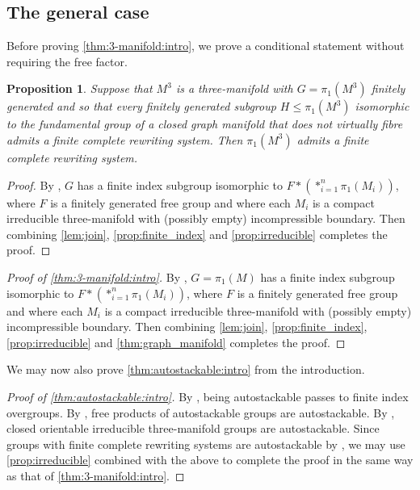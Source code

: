 \documentclass[12pt, a4paper]{amsart}
\newtheorem{proposition}[theorem]{Proposition}
\theoremstyle{definition}
\begin{document}
\subsection{The general case}

Before proving \cref{thm:3-manifold:intro}, we prove a conditional statement without requiring the free factor.

\begin{proposition}
\label{prop:conditional}
Suppose that $M^3$ is a three-manifold with $G = \pi_1(M^3)$ finitely generated and so that every finitely generated subgroup $H\leqslant \pi_1(M^3)$ isomorphic to the fundamental group of a closed graph manifold that does not virtually fibre admits a finite complete rewriting system. Then $\pi_1(M^3)$ admits a finite complete rewriting system.
\end{proposition}

\begin{proof}
By \cite[Proposition 2.2]{KL24b}, $G$ has a finite index subgroup isomorphic to $F*(*_{i=1}^n\pi_1(M_i))$, where $F$ is a finitely generated free group and where each $M_i$ is a compact irreducible three-manifold with (possibly empty) incompressible boundary. Then combining \cref{lem:join}, \cref{prop:finite_index} and \cref{prop:irreducible} completes the proof.
\end{proof}



\begin{proof}[Proof of \cref{thm:3-manifold:intro}]
By \cite[Proposition 2.2]{KL24b}, $G = \pi_1(M)$ has a finite index subgroup isomorphic to $F*(*_{i=1}^n\pi_1(M_i))$, where $F$ is a finitely generated free group and where each $M_i$ is a compact irreducible three-manifold with (possibly empty) incompressible boundary. Then combining \cref{lem:join}, \cref{prop:finite_index}, \cref{prop:irreducible} and \cref{thm:graph_manifold} completes the proof.
\end{proof}


We may now also prove \cref{thm:autostackable:intro} from the introduction. 


\begin{proof}[Proof of \cref{thm:autostackable:intro}]
By \cite[Theorem 3.4]{Brittenham2016}, being autostackable passes to finite index overgroups. By \cite[Theorem 3.2]{Brittenham2016}, free products of autostackable groups are autostackable. By \cite[Theorem 6.2]{Hermiller2018}, closed orientable irreducible three-manifold groups are autostackable. Since groups with finite complete rewriting systems are autostackable by \cite[Corollary 5.4]{Brittenham2014}, we may use \cref{prop:irreducible} combined with the above to complete the proof in the same way as that of \cref{thm:3-manifold:intro}. 
\end{proof}
\end{document}
